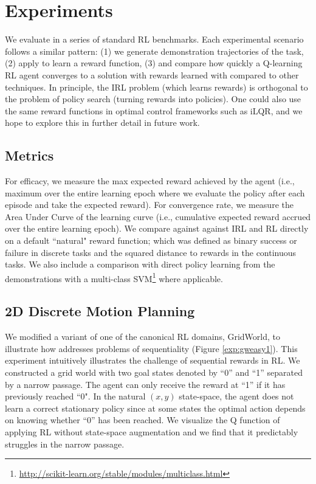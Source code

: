 %

\section{Experiments}\label{sec:exp}
We evaluate \hirl in a series of standard RL benchmarks. Each experimental scenario follows a similar pattern: (1) we generate demonstration trajectories of the task, (2) apply \hirl to learn a reward function, (3) and compare how quickly a Q-learning RL agent converges to a solution with rewards learned with \hirl compared to other techniques.
In principle, the IRL problem (which learns rewards) is orthogonal to the problem of policy search (turning rewards into policies).
One could also use the same reward functions in optimal control frameworks such as iLQR, and we hope to explore this in further detail in future work. 

\subsection{Metrics}
For efficacy, we measure the max expected reward achieved by the agent (i.e., maximum over the entire learning epoch where we evaluate the policy after each episode and take the expected reward). For convergence rate, we measure the Area Under Curve of the learning curve (i.e., cumulative expected reward accrued over the entire learning epoch).
We compare against against IRL and RL directly on a default ``natural" reward function; which was defined as binary success or failure in discrete tasks and the squared distance to rewards in the continuous tasks.
We also include a comparison with direct policy learning from the demonstrations with a multi-class SVM\footnote{\url{http://scikit-learn.org/stable/modules/multiclass.html}} where applicable.

\subsection{2D Discrete Motion Planning}\label{exp:2dmp}
We modified a variant of one of the canonical RL domains, GridWorld, to illustrate how \hirl addresses problems of sequentiality (Figure \ref{exp:gweasy1}). 
This experiment intuitively illustrates the challenge of sequential rewards in RL.
We constructed a grid world with two goal states denoted by ``0'' and ``1'' separated by a narrow passage.
The agent can only receive the reward at ``1'' if it has previously reached ``0".
In the natural $(x,y)$ state-space, the agent does not learn a correct stationary policy since at some states the optimal action depends on knowing whether ``0'' has been reached.
We visualize the Q function of applying RL without state-space augmentation and we find that it predictably struggles in the narrow passage.

